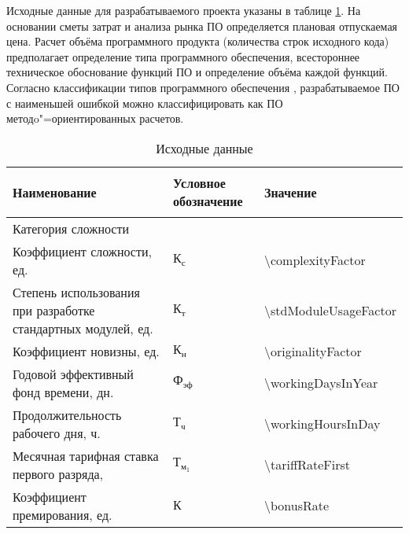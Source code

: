 Исходные данные для разрабатываемого проекта указаны в таблице \ref{table:econ:initial_data}. На основании сметы затрат и анализа рынка ПО определяется плановая отпускаемая цена.
Расчет объёма программного продукта (количества строк исходного кода) предполагает определение типа программного обеспечения, всестороннее техническое обоснование функций ПО и определение объёма каждой функций.
Согласно классификации типов программного обеспечения \cite[с.~59,~приложение 1]{palicyn_2006}, разрабатываемое ПО с наименьшей ошибкой можно классифицировать как ПО методo"=ориентированных расчетов.

\begin{table}[!ht]
\caption{Исходные данные}
\label{table:econ:initial_data}
  \centering
  \begin{tabular}{| >{\raggedright}m{}
                  | >{\centering}m{}
                  | >{\centering\arraybackslash}m{}|}
    \hline
    {\begin{center}
      Наименование
    \end{center} } & Условное обозначение & Значение \\
    \hline
    Категория сложности & & 2 \\

    \hline
    Коэффициент сложности, ед. & $ \text{К}_\text{с} $ & \num{\complexityFactor} \\

    \hline
    Степень использования при разработке стандартных модулей, ед. & $ \text{К}_\text{т} $ & \num{\stdModuleUsageFactor} \\

    \hline
    Коэффициент новизны, ед. & $ \text{К}_\text{н} $ & \num{\originalityFactor} \\

    \hline
    Годовой эффективный фонд времени, дн. & $ \text{Ф}_\text{эф} $ & \num{\workingDaysInYear} \\

    \hline
    Продолжительность рабочего дня, ч. & $ \text{Т}_\text{ч} $ & \num{\workingHoursInDay} \\

    \hline
    Месячная тарифная ставка первого разряда, \byr{} & $ \text{Т}_{\text{м}_{1}}$ & \num{\tariffRateFirst} \\

    \hline
    Коэффициент премирования, ед. & $ \text{К} $ & \num{\bonusRate} \\


\end{tabular}
\end{table}
